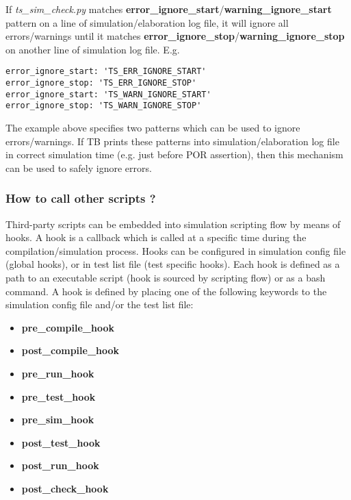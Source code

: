 \documentclass{tropic_design_spec}
\begin{document}
If \textit{ts_sim_check.py} matches \textbf{error_ignore_start}/\textbf{warning_ignore_start}
pattern on a line of simulation/elaboration log file, it will ignore all errors/warnings
until it matches \textbf{error_ignore_stop}/\textbf{warning_ignore_stop} on another line
of simulation log file. E.g.

\begin{lstlisting}
error_ignore_start: 'TS_ERR_IGNORE_START'
error_ignore_stop: 'TS_ERR_IGNORE_STOP'
error_ignore_start: 'TS_WARN_IGNORE_START'
error_ignore_stop: 'TS_WARN_IGNORE_STOP'
\end{lstlisting}

The example above specifies two patterns which can be used to ignore errors/warnings.
If TB prints these patterns into simulation/elaboration log file in correct simulation time (e.g.
just before POR assertion), then this mechanism can be used to safely ignore errors.



\subsubsection{How to call other scripts ?}
\label{sec:how-to-call-other-scripts}

Third-party scripts can be embedded into simulation scripting flow by means of hooks.
A hook is a callback which is called at a specific time during the compilation/simulation process.
Hooks can be configured in simulation config file (global hooks), or in test list file
(test specific hooks). Each hook is defined as a path to an executable script (hook is
sourced by scripting flow) or as a bash command. A hook is defined by placing one of
the following keywords to the simulation config file and/or the test list file:
\begin{itemize}
    \item {\textbf{pre_compile_hook}}
    \item {\textbf{post_compile_hook}}
    \item {\textbf{pre_run_hook}}
    \item {\textbf{pre_test_hook}}
    \item {\textbf{pre_sim_hook}}
    \item {\textbf{post_test_hook}}
    \item {\textbf{post_run_hook}}
    \item {\textbf{post_check_hook}}
\end{itemize}
\end{document}
